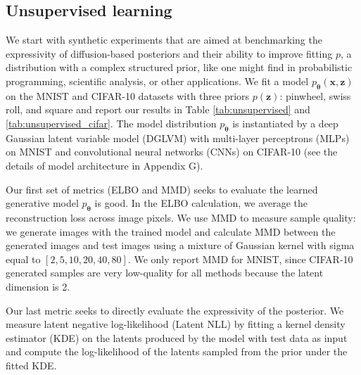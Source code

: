 \documentclass[letterpaper]{article} %
\newcommand{\bx}{\mathbf{x}}
\newcommand{\bz}{\mathbf{z}}
\newcommand{\yw}[1]{\textbf{\textcolor{blue}{Yingheng: #1}} }
\let\oldtheta\theta
\renewcommand{\theta}{{\boldsymbol \oldtheta}}
\begin{document}
\subsection{Unsupervised learning}

We start with synthetic experiments that are aimed at benchmarking the expressivity of diffusion-based posteriors and their ability to improve fitting $p$, a distribution with a complex structured prior, like one might find in probabilistic programming, scientific analysis, or other applications.
We fit a model $p_\theta(\bx,\bz)$ on the MNIST and CIFAR-10 datasets with three priors $p(\bz)$: pinwheel, swiss roll, and square and report our results in Table \ref{tab:unsupervised} and \ref{tab:unsupervised_cifar}. 
The model distribution $p_\theta$ is instantiated by a deep Gaussian latent variable model (DGLVM) with multi-layer perceptrons (MLPs) on MNIST and convolutional neural networks (CNNs) on CIFAR-10 (see the details of model architecture in Appendix G).

Our first set of metrics (ELBO and MMD) seeks to evaluate the learned generative model $p_\theta$ is good. In the ELBO calculation, we average the reconstruction loss across image pixels.
We use MMD to measure sample quality: we generate images with the trained model and calculate MMD between the generated images and test images using a mixture of Gaussian kernel with sigma equal to $[2, 5, 10, 20, 40, 80]$. We only report MMD for MNIST, since CIFAR-10 generated samples are very low-quality for all methods because the latent dimension is 2.

Our last metric seeks to directly evaluate the expressivity of the posterior.
We measure latent negative log-likelihood (Latent NLL) by fitting a kernel density estimator (KDE) on the latents produced by the model with test data as input and compute the log-likelihood of the latents sampled from the prior under the fitted KDE.
\end{document}
